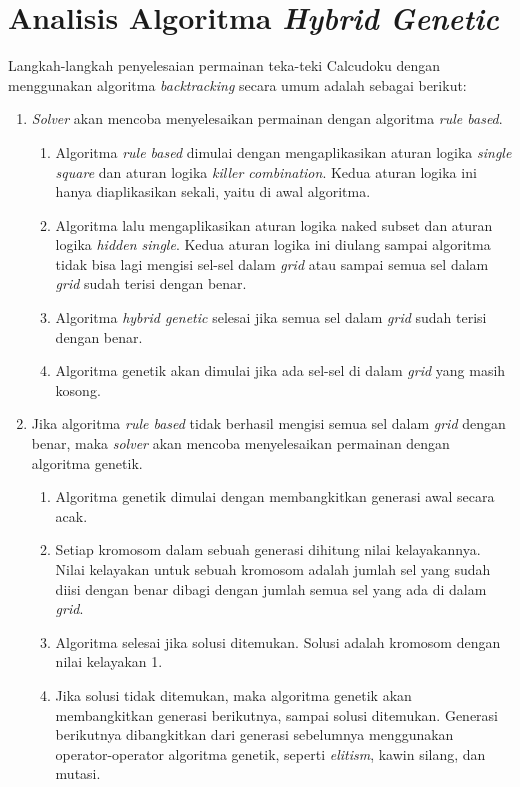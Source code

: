 \section{Analisis Algoritma \textit{Hybrid Genetic}}
\label{sec:analisishg}

Langkah-langkah penyelesaian permainan teka-teki Calcudoku dengan menggunakan algoritma \textit{backtracking} secara umum adalah sebagai berikut:

\begin{enumerate}
\item \textit{Solver} akan mencoba menyelesaikan permainan dengan algoritma \textit{rule based}.
	\begin{enumerate}
	\item Algoritma \textit{rule based} dimulai dengan mengaplikasikan aturan logika \textit{single square} dan aturan logika \textit{killer combination}. Kedua aturan logika ini hanya diaplikasikan sekali, yaitu di awal algoritma.
	\item Algoritma lalu mengaplikasikan aturan logika naked subset dan aturan logika \textit{hidden single}. Kedua aturan logika ini diulang sampai algoritma tidak bisa lagi mengisi sel-sel dalam \textit{grid} atau sampai semua sel dalam \textit{grid} sudah terisi dengan benar.
	\item Algoritma \textit{hybrid genetic} selesai jika semua sel dalam \textit{grid} sudah terisi dengan benar.
        \item Algoritma genetik akan dimulai jika ada sel-sel di dalam \textit{grid} yang masih kosong.
	\end{enumerate}
\item Jika algoritma \textit{rule based} tidak berhasil mengisi semua sel dalam \textit{grid} dengan benar, maka \textit{solver} akan mencoba menyelesaikan permainan dengan algoritma genetik.
	\begin{enumerate}
	\item Algoritma genetik dimulai dengan membangkitkan generasi awal secara acak.
	\item Setiap kromosom dalam sebuah generasi dihitung nilai kelayakannya. Nilai kelayakan untuk sebuah kromosom adalah jumlah sel yang sudah diisi dengan benar dibagi dengan jumlah semua sel yang ada di dalam \textit{grid}.
	\item Algoritma selesai jika solusi ditemukan. Solusi adalah kromosom dengan nilai kelayakan 1.
	\item Jika solusi tidak ditemukan, maka algoritma genetik akan membangkitkan generasi berikutnya, sampai solusi ditemukan. Generasi berikutnya dibangkitkan dari generasi sebelumnya menggunakan operator-operator algoritma genetik, seperti \textit{elitism}, kawin silang, dan mutasi.
	\end{enumerate}
\end{enumerate}

